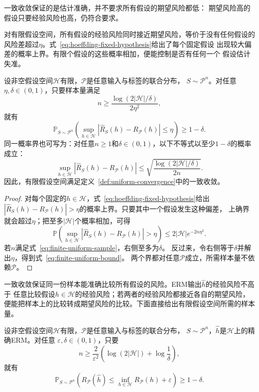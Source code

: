一致收敛保证的是估计准确，并不要求所有假设的期望风险都低：
期望风险高的假设只要经验风险也高，仍符合要求。

对有限假设空间，所有假设的经验风险同时接近期望风险，等价于没有任何假设的
风险差超过$\eta$。式~\eqref{eq:hoeffding-fixed-hypothesis}给出了每个固定假设
出现较大偏差的概率上界。有限个假设的这些概率相加，便能控制是否有任何一个
假设估计失准。

\begin{theorem}[有限假设空间的一致收敛样本量界]
\label{thm:finite-uniform-convergence}
设非空假设空间$\mathcal H$有限，$\mathcal P$是任意输入与标签的联合分布，
$S\sim\mathcal P^n$。对任意$\eta,\delta\in(0,1)$，只要样本量满足
\begin{equation}
 n\geq\frac{\log(2|\mathcal H|/\delta)}{2\eta^2},
 \label{eq:finite-uniform-sample}
\end{equation}
就有
\[
 \mathbb P_{S\sim\mathcal P^n}\left(
 \sup_{h\in\mathcal H}|\hat R_S(h)-R_{\mathcal P}(h)|\leq\eta
 \right)\geq1-\delta.
\]
同一概率界也可写为：对任意$n\geq1$和$\delta\in(0,1)$，以下不等式以至少$1-\delta$的概率成立：
\begin{equation}
 \sup_{h\in\mathcal H}|\hat R_S(h)-R_{\mathcal P}(h)|
 \leq\sqrt{\frac{\log(2|\mathcal H|/\delta)}{2n}}.
 \label{eq:finite-uniform-bound}
\end{equation}
因此，有限假设空间满足定义~\ref{def:uniform-convergence}中的一致收敛。
\end{theorem}

\begin{proof}
对每个固定的$h\in\mathcal H$，式~\eqref{eq:hoeffding-fixed-hypothesis}给出
$|\hat R_S(h)-R_{\mathcal P}(h)|>\eta$的概率上界。只要其中一个假设发生这种偏差，
上确界就会超过$\eta$；把至多$|\mathcal H|$个概率相加，可得
\[
 \mathbb P\left(\sup_{h\in\mathcal H}|\hat R_S(h)-R_{\mathcal P}(h)|>\eta\right)
 \leq 2|\mathcal H|e^{-2n\eta^2}.
\]
若$n$满足式~\eqref{eq:finite-uniform-sample}，右侧至多为$\delta$。
反过来，令右侧等于$\delta$并解出$\eta$，得到式~\eqref{eq:finite-uniform-bound}。
两个界都对任意$\mathcal P$成立，所需样本量不依赖$\mathcal P$。
\end{proof}

一致收敛保证同一份样本能准确比较所有假设的风险。ERM输出$\hat h$的经验风险不高于
任意比较假设$h\in\mathcal H$的经验风险；若两者的经验风险都接近各自的期望风险，
便能把样本上的比较转成期望风险的比较。下面直接给出有限假设空间所需的样本量。

\begin{theorem}[有限假设空间的不可知PAC样本量界]
\label{thm:finite-agnostic-pac}
设非空假设空间$\mathcal H$有限，$\mathcal P$是任意输入与标签的联合分布，
$S\sim\mathcal P^n$，$\hat h$是$\mathcal H$上的精确ERM。对任意
$\varepsilon,\delta\in(0,1)$，只要
\begin{equation}
 n\geq\frac{2}{\varepsilon^2}
 \left(\log(2|\mathcal H|)+\log\frac1\delta\right),
 \label{eq:finite-agnostic-sample}
\end{equation}
就有
\[
 \mathbb P_{S\sim\mathcal P^n}\left(
 R_{\mathcal P}(\hat h)\leq\inf_{h\in\mathcal H}R_{\mathcal P}(h)+\varepsilon
 \right)\geq1-\delta.
\]
\end{theorem}


